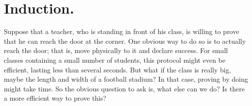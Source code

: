 
\section{Induction.}


Suppose that a teacher, who is standing in front of his class, is willing to prove that he can reach the door at the corner. One obvious way to do so is to actually reach the door; that is, move physically to it and declare success. For small classes containing a small number of students, this protocol might even be efficient, lasting less than several seconds. But what if the class is really big, maybe the length and width of a football stadium? In that case, proving by doing might take time. So the obvious question to ask is, what else can we do? Is there a more efficient way to prove this?

